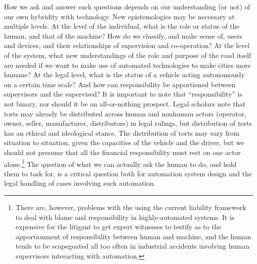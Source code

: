 How we ask and answer such questions depends on our understanding (or
not) of our own hybridity with technology. New epistemologies may be
necessary at multiple levels. At the level of the individual, what is
the role or status of the human, and that of the machine? How do we
classify, and make sense of, users and devices, and their
relationships of supervision and co-operation? At the level of the
system, what new understandings of the role and purpose of the road
itself are needed if we want to make use of automated technologies to
make cities more humane? At the legal level, what is the status of a
vehicle acting autonomously on a certain time scale? And how can
responsibility be apportioned between supervisors and the supervised?
It is important to note that ``responsibility'' is not binary, nor
should it be an all-or-nothing prospect. Legal scholars note that
torts may already be distributed across human and nonhuman actors
(operator, owner, seller, manufacturer, distributors) in legal
rulings, but distribution of torts has an ethical
and ideological stance\cite{???-suemycar,etc}. The distribution of
torts may vary from situation to situation, given the capacities of
the vehicle and the driver\cite{???-disableddriverexample}, but we
should not presume that all the financial responsibility must rest on
one actor alone.\footnote{There are, however, problems with the using
  the current liability framework to deal with blame and
  responsibility in highly-automated systems. It is expensive for the
litigant to get expert witnesses to testify as to the apportionment of
responsibility between human and machine, and the human tends to be
scapegoated all too often in industrial accidents involving human
supervisors interacting with automation.} 
The question of what we can actually ask the human to do, and hold them to task
for, is a critical question both for automation system design and the
legal handling of cases involving such automation.

